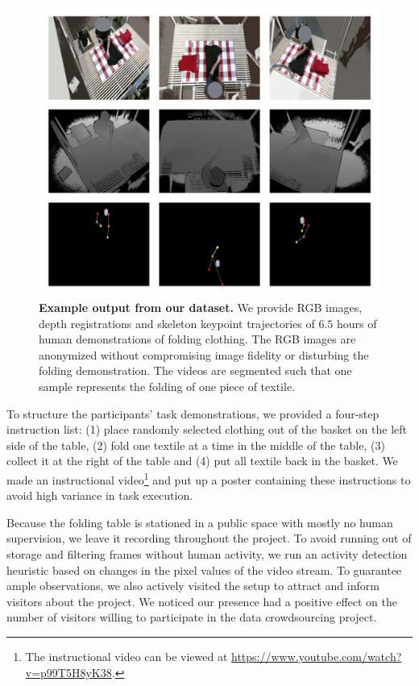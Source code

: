\documentclass[\home/main.tex]{subfiles}
\begin{document}
\begin{figure}[htpb]
    \centering
    \includegraphics[width=\textwidth, height=0.70\textheight]{figures/3x3-sample} %
    \caption{ \textbf{Example output from our dataset.} We provide RGB images, depth registrations and skeleton keypoint trajectories of $6.5$ hours of human demonstrations of folding clothing. The RGB images are anonymized without compromising image fidelity or disturbing the folding demonstration. The videos are segmented such that one sample represents the folding of one piece of textile.}
    \label{fig:fig1}
\end{figure}

To structure the participants' task demonstrations, we provided a four-step instruction list: (1) place randomly selected clothing out of the basket on the left side of the table, (2) fold one textile at a time in the middle of the table, (3) collect it at the right of the table and (4) put all textile back in the basket. We made an instructional video\footnote{The instructional video can be viewed at \url{https://www.youtube.com/watch?v=p99T5H8yK38}.} and put up a poster containing these instructions to avoid high variance in task execution.  \par

Because the folding table is stationed in a public space with mostly no human supervision, we leave it recording throughout the project. To avoid running out of storage and filtering frames without human activity, we run an activity detection heuristic based on changes in the pixel values of the video stream. To guarantee ample observations, we also actively visited the setup to attract and inform visitors about the project. We noticed our presence had a positive effect on the number of visitors willing to participate in the data crowdsourcing project. \par
\end{document}

